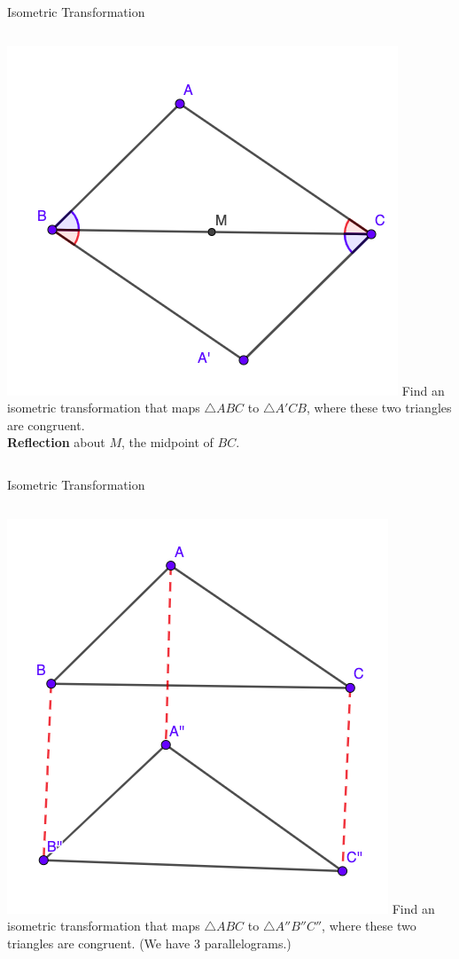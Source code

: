 \documentclass{beamer}
\begin{document}
\begin{frame}{Isometric Transformation}
	\begin{columns}
		\includegraphics[scale=0.4]{iso3.png}
		Find an isometric transformation that maps $\triangle
		ABC$ to $\triangle A'CB$, where these two triangles
		are congruent.\\
		\phantom{Spacing}
		\textbf{Reflection} about $M$, the midpoint of $BC$.
	\end{columns}
\end{frame}
\begin{frame}{Isometric Transformation}
	\begin{columns}
		\column{0.6\textwidth}
		\includegraphics[scale=0.4]{iso4.png}
		\column{0.4\textwidth}
		Find an isometric transformation that maps $\triangle
		ABC$ to $\triangle A''B''C''$, where these two triangles
		are congruent. (We have 3 parallelograms.)
	\end{columns}
\end{frame}
\end{document}
